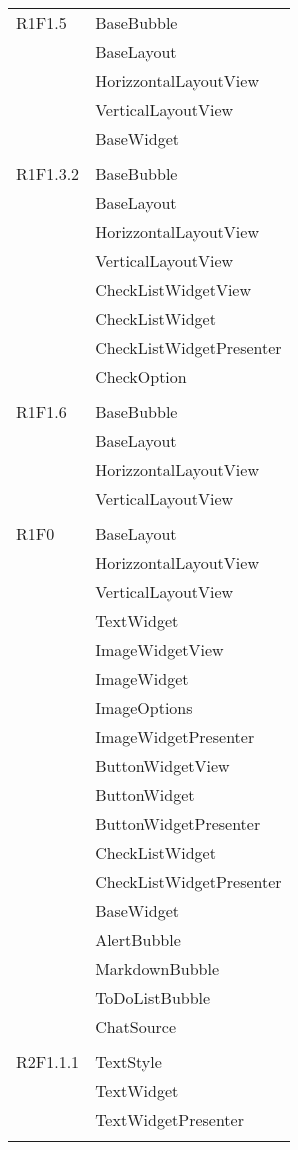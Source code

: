 \begin{center}
\begin{longtable}{|p{7cm}|p{7cm}|}
		R1F1.5 & BaseBubble \\ & BaseLayout \\ & HorizzontalLayoutView \\ & VerticalLayoutView \\ & BaseWidget \\ & \\ \hline
		R1F1.3.2 & BaseBubble \\ & BaseLayout \\ & HorizzontalLayoutView \\ & VerticalLayoutView \\ & CheckListWidgetView \\ & CheckListWidget \\ & CheckListWidgetPresenter \\ & CheckOption \\ & \\ \hline
		R1F1.6 & BaseBubble \\ & BaseLayout \\ & HorizzontalLayoutView \\ & VerticalLayoutView \\ & \\ \hline
		R1F0 & BaseLayout \\ & HorizzontalLayoutView \\ & VerticalLayoutView \\ & TextWidget \\ & ImageWidgetView \\ & ImageWidget \\ & ImageOptions \\ & ImageWidgetPresenter \\ & ButtonWidgetView \\ & ButtonWidget \\ & ButtonWidgetPresenter \\ & CheckListWidget \\ & CheckListWidgetPresenter \\ & BaseWidget \\ & AlertBubble \\ & MarkdownBubble \\ & ToDoListBubble \\ & ChatSource \\ & \\ \hline
		R2F1.1.1 & TextStyle \\ & TextWidget \\ & TextWidgetPresenter \\ & \\ \hline

\end{longtable}
\end{center}
